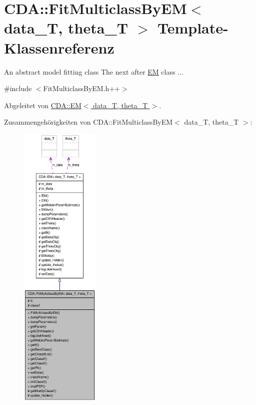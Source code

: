 \hypertarget{classCDA_1_1FitMulticlassByEM}{
\section{CDA::FitMulticlassByEM$<$ data\_\-T, theta\_\-T $>$ Template-\/Klassenreferenz}
\label{classCDA_1_1FitMulticlassByEM}
}


An abstract model fitting class The next after \hyperlink{classCDA_1_1EM}{EM} class ...  




{\ttfamily \#include $<$FitMulticlassByEM.h++$>$}



Abgeleitet von \hyperlink{classCDA_1_1EM}{CDA::EM$<$ data\_\-T, theta\_\-T $>$}.



Zusammengehörigkeiten von CDA::FitMulticlassByEM$<$ data\_\-T, theta\_\-T $>$:\nopagebreak
\begin{figure}[H]
\begin{center}
\leavevmode
\includegraphics[height=400pt]{classCDA_1_1FitMulticlassByEM__coll__graph}
\end{center}
\end{figure}
